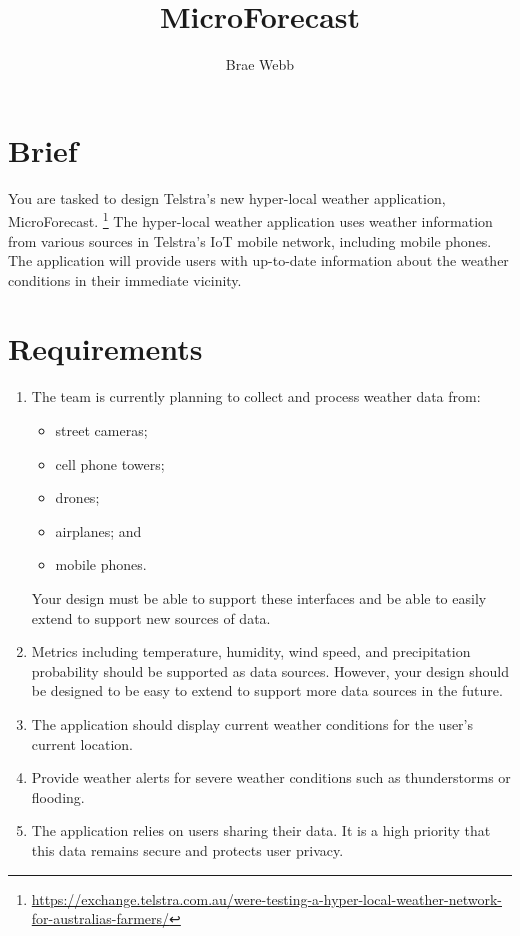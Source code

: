 \documentclass{csse4400}
\title{MicroForecast}
\author{Brae Webb}
\date{\week[tutorial]{3}}
\begin{document}
\maketitle

\section{Brief}

You are tasked to design Telstra's new hyper-local weather application, MicroForecast.%
\footnote{\url{https://exchange.telstra.com.au/were-testing-a-hyper-local-weather-network-for-australias-farmers/}}
The hyper-local weather application uses weather information from various sources in Telstra's IoT mobile network,
including mobile phones.
The application will provide users with up-to-date information about the weather conditions in their immediate vicinity.

\section{Requirements}

\begin{enumerate}
    \item The team is currently planning to collect and process weather data from:
        \begin{itemize}
            \item street cameras;
            \item cell phone towers;
            \item drones;
            \item airplanes; and
            \item mobile phones.
        \end{itemize}
        Your design must be able to support these interfaces and be able to easily extend to support new sources of data.
    \item Metrics including temperature, humidity, wind speed, and precipitation probability should be supported as data sources.
        However, your design should be designed to be easy to extend to support more data sources in the future.
    \item The application should display current weather conditions for the user's current location.
    \item Provide weather alerts for severe weather conditions such as thunderstorms or flooding.
    \item The application relies on users sharing their data. It is a high priority that this data remains secure and protects user privacy.
\end{enumerate}
\end{document}
